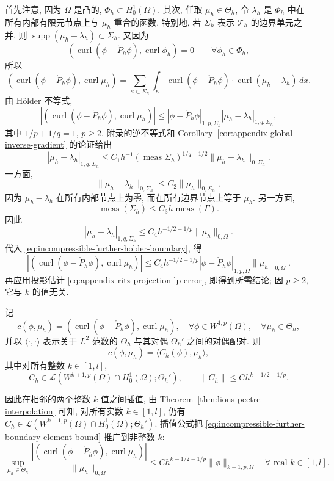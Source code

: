 \begin{Proof}
首先注意, 因为 $\Omega$ 是凸的, $\Phi_h\subset H_0^1(\Omega)$.
其次, 任取 $\mu_h\in\Theta_h$,
令 $\lambda_h$ 是 $\Phi_h$ 中在所有内部有限元节点上与 $\mu_h$
重合的函数. 特别地, 若 $\Sigma_h$ 表示 $\mathcal T_h$
的边界单元之并, 则
$\operatorname{supp}(\mu_h-\lambda_h)\subset\Sigma_h$.
又因为
\[
(\operatorname{curl}(\phi-\mathring P_h\phi),
\operatorname{curl}\phi_h)=0
\qquad\forall\phi_h\in\Phi_h,
\]
所以
\[
(\operatorname{curl}(\phi-\mathring P_h\phi),
\operatorname{curl}\mu_h)
=\sum_{\kappa\subset\Sigma_h}
\int_\kappa
\operatorname{curl}(\phi-\mathring P_h\phi)
\cdot\operatorname{curl}(\mu_h-\lambda_h)\,dx.
\]
由 Hölder 不等式,
\begin{equation}\label{eq:incompressible-further-holder-boundary}
|(\operatorname{curl}(\phi-\mathring P_h\phi),
\operatorname{curl}\mu_h)|
\leq|\phi-\mathring P_h\phi|_{1,p,\Sigma_h}
|\mu_h-\lambda_h|_{1,q,\Sigma_h},
\end{equation}
其中 $1/p+1/q=1$, $p\geq2$.
附录的逆不等式和
Corollary~\ref{cor:appendix-global-inverse-gradient} 的论证给出
\[
|\mu_h-\lambda_h|_{1,q,\Sigma_h}
\leq C_1h^{-1}(\operatorname{meas}\Sigma_h)^{1/q-1/2}
\|\mu_h-\lambda_h\|_{0,\Sigma_h}.
\]
一方面,
\[
\|\mu_h-\lambda_h\|_{0,\Sigma_h}
\leq C_2\|\mu_h\|_{0,\Sigma_h},
\]
因为 $\mu_h-\lambda_h$ 在所有内部节点上为零,
而在所有边界节点上等于 $\mu_h$.
另一方面,
\[
\operatorname{meas}(\Sigma_h)
\leq C_3h\operatorname{meas}(\Gamma).
\]
因此
\[
|\mu_h-\lambda_h|_{1,q,\Sigma_h}
\leq C_4h^{-1/2-1/p}\|\mu_h\|_{0,\Omega}.
\]
代入 \eqref{eq:incompressible-further-holder-boundary}, 得
\[
|(\operatorname{curl}(\phi-\mathring P_h\phi),
\operatorname{curl}\mu_h)|
\leq C_4h^{-1/2-1/p}
|\phi-\mathring P_h\phi|_{1,p,\Omega}
\|\mu_h\|_{0,\Omega}.
\]
再应用投影估计
\eqref{eq:appendix-ritz-projection-lp-error},
即得到所需结论; 因 $p\geq2$, 它与 $k$ 的值无关.
\end{Proof}

\begin{Remark}\label{rem:incompressible-further-real-order-interpolation}
记
\[
c(\phi,\mu_h)
=(\operatorname{curl}(\phi-\mathring P_h\phi),
\operatorname{curl}\mu_h),
\quad
\forall\phi\in W^{1,p}(\Omega),
\quad\forall\mu_h\in\Theta_h,
\]
并以 $\langle\cdot,\cdot\rangle$ 表示关于 $L^2$ 范数的
$\Theta_h$ 与其对偶 $\Theta_h'$ 之间的对偶配对. 则
\[
c(\phi,\mu_h)=\langle C_h(\phi),\mu_h\rangle,
\]
其中对所有整数 $k\in[1,l]$,
\[
C_h\in\mathcal L(W^{k+1,p}(\Omega)\cap H_0^1(\Omega);\Theta_h'),
\qquad
\|C_h\|\leq Ch^{k-1/2-1/p}.
\]

因此在相邻的两个整数 $k$ 值之间插值,
由 Theorem~\ref{thm:lions-peetre-interpolation} 可知,
对所有实数 $k\in[1,l]$, 仍有
$C_h\in\mathcal L(W^{k+1,p}(\Omega)\cap H_0^1(\Omega);\Theta_h')$.
插值公式把
\eqref{eq:incompressible-further-boundary-element-bound}
推广到非整数 $k$:
\begin{equation}\label{eq:incompressible-further-boundary-element-real-order}
\sup_{\mu_h\in\Theta_h}
\frac{|(\operatorname{curl}(\phi-\mathring P_h\phi),
\operatorname{curl}\mu_h)|}{\|\mu_h\|_{0,\Omega}}
\leq Ch^{k-1/2-1/p}\|\phi\|_{k+1,p,\Omega}
\quad\forall\text{ real }k\in[1,l].
\end{equation}
\end{Remark}

